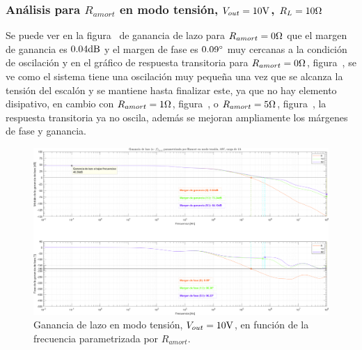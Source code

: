 
\subsubsection{Análisis para $R_{amort}$ en modo tensión, $V_{out} = 10 \si[per-mode=symbol]{\volt}$, $R_{L} = 10 \si[per-mode=symbol]{\ohm}$}

Se puede ver en la figura~ de ganancia de lazo para $R_{amort} = 0 \si[per-mode=symbol]{\ohm} $ que el margen de ganancia es $0.04 \si[per-mode=symbol]{\decibel} $ y el margen de fase es $0.09 \si[per-mode=symbol]{\degree} $ muy cercanas a la condición de oscilación  y en el gráfico de respuesta transitoria para $R_{amort} = 0 \si[per-mode=symbol]{\ohm} $, figura~, se ve como el sistema tiene una oscilación muy pequeña una vez que se alcanza la tensión del escalón y se mantiene hasta finalizar este, ya que no hay elemento disipativo, en cambio con $R_{amort} = 1 \si[per-mode=symbol]{\ohm} $, figura~, o $R_{amort} = 5 \si[per-mode=symbol]{\ohm} $, figura~, la respuesta transitoria ya no oscila, además se mejoran ampliamente los márgenes de fase y ganancia.

\vfill



\clearpage

\begin{figure}[H] %
\begin{center}
\includegraphics[width=1.1 \textwidth, angle=90]{./img/plots/loop/power_supply_RAMORT_LOOP_Modo1.png}
\caption{\label{fig:fig_power_supply_RAMORT_LOOP_Modo1}\footnotesize{Ganancia de lazo en modo tensión, $V_{out} = 10 \si[per-mode=symbol]{\volt}$, en función de la frecuencia parametrizada por $R_{amort}$.}}
\end{center}
\end{figure}


